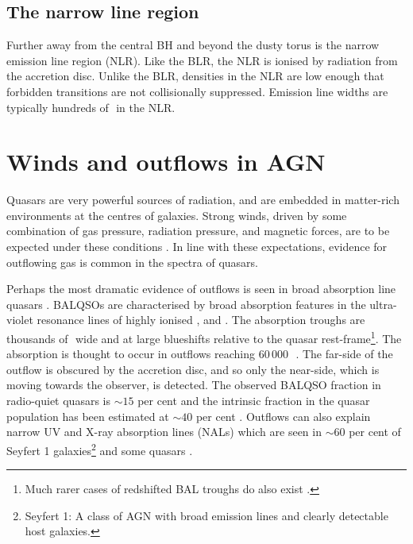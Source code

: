 \subsection{The narrow line region}

Further away from the central BH and beyond the dusty torus is the narrow emission line region (NLR). 
Like the BLR, the NLR is ionised by radiation from the accretion disc. 
Unlike the BLR, densities in the NLR are low enough that forbidden transitions are not collisionally suppressed. 
Emission line widths are typically hundreds of\,\kms\, in the NLR. 

\section{Winds and outflows in AGN}

Quasars are very powerful sources of radiation, and are embedded in matter-rich environments at the centres of galaxies.
Strong winds, driven by some combination of gas pressure, radiation pressure, and magnetic forces, are to be expected under these conditions \citep[e.g.][]{blandford82b,proga00,everett05}. 
In line with these expectations, evidence for outflowing gas is common in the spectra of quasars. 

Perhaps the most dramatic evidence of outflows is seen in broad absorption line quasars \citep[BALQSOs;][]{weymann91}.
BALQSOs are characterised by broad absorption features in the ultra-violet resonance lines of highly ionised ,  and . 
The absorption troughs are thousands of\,\kms\, wide and at large blueshifts relative to the quasar rest-frame\footnote{Much rarer cases of redshifted BAL troughs do also exist \citep[e.g.][]{hall13}.}. 
The absorption is thought to occur in outflows reaching $60\,000$\,\kms\, \citep[e.g.][]{turnshek88}. 
The far-side of the outflow is obscured by the accretion disc, and so only the near-side, which is moving towards the observer, is detected. 
The observed  BALQSO fraction in radio-quiet quasars is $\sim15$ per cent \citep[e.g.][]{hewett03,reichard03} and the intrinsic fraction in the quasar population has been estimated at $\sim40$ per cent \citep{allen11}.
Outflows can also explain narrow UV and X-ray absorption lines (NALs) which are seen in $\sim60$ per cent of Seyfert 1 galaxies\footnote{Seyfert 1: A class of AGN with broad emission lines and clearly detectable host galaxies.} \citep{crenshaw99} and some quasars \citep[e.g.][]{hamann97}. 

